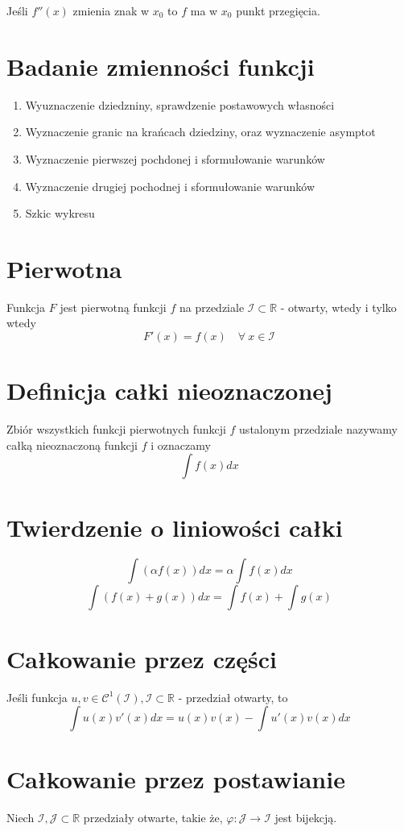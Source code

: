 \documentclass[11pt]{article}
\begin{document}
Jeśli $f''(x)$ zmienia znak w $x_0$ to $f$ ma w $x_0$ punkt przegięcia.
\section{Badanie zmienności funkcji}
\begin{enumerate}
\item{Wyuznaczenie dziedzniny, sprawdzenie postawowych własności}
\item{Wyznaczenie granic na krańcach dziedziny, oraz wyznaczenie asymptot}
\item{Wyznaczenie pierwszej pochdonej i sformułowanie warunków}
\item{Wyznaczenie drugiej pochodnej i sformułowanie warunków}
\item{Szkic wykresu}
\end{enumerate}

\section{Pierwotna}
Funkcja $F$ jest pierwotną funkcji $f$ na przedziale $\mathcal{I} \subset \mathbb{R}$ - otwarty, wtedy i tylko wtedy $$ F'(x) = f(x) \quad \forall\ x \in \mathcal{I}$$
\section{Definicja całki nieoznaczonej}
Zbiór wszystkich funkcji pierwotnych funkcji $f$ ustalonym przedziale nazywamy całką nieoznaczoną funkcji $f$ i oznaczamy $$ \int f(x)dx$$

\section{Twierdzenie o liniowości całki}
$$ \int ( \alpha f(x)) dx = \alpha \int f(x) dx $$
$$ \int ( f(x) + g(x)) dx = \int f(x) + \int g(x) $$

\section{Całkowanie przez części}
Jeśli funkcja $ u,v \in \mathcal{C}^1(\mathcal{I}), \mathcal{I} \subset \mathbb{R}$ - przedział otwarty, to $$ \int u(x)v'(x)dx = u(x)v(x) - \int u'(x)v(x)dx $$

\section{Całkowanie przez postawianie}
Niech $\mathcal{I,J} \subset \mathbb{R}$ przedziały otwarte, takie że, $\varphi : \mathcal{J} \to \mathcal{I} $ jest bijekcją.
\end{document}
